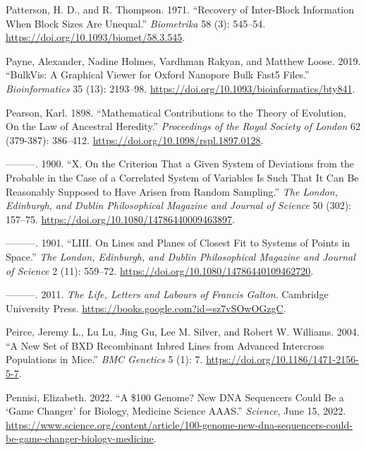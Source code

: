 \documentclass[
]{book}
\newlength{\cslhangindent}
\newlength{\cslentryspacingunit} %
\newenvironment{CSLReferences}[2] %
 {%
  \setlength{\parindent}{0pt}
  \ifodd #1
  \let\oldpar\par
  \def\par{\hangindent=\cslhangindent\oldpar}
  \fi
  \setlength{\parskip}{#2\cslentryspacingunit}
 }%
 {}
\begin{document}
\begin{CSLReferences}{1}{0}
\leavevmode{}%
Patterson, H. D., and R. Thompson. 1971. {``Recovery of Inter-Block Information When Block Sizes Are Unequal.''} \emph{Biometrika} 58 (3): 545--54. \url{https://doi.org/10.1093/biomet/58.3.545}.

\leavevmode{}%
Payne, Alexander, Nadine Holmes, Vardhman Rakyan, and Matthew Loose. 2019. {``{BulkVis}: A Graphical Viewer for {Oxford} Nanopore Bulk {Fast5} Files.''} \emph{Bioinformatics} 35 (13): 2193--98. \url{https://doi.org/10.1093/bioinformatics/bty841}.

\leavevmode{}%
Pearson, Karl. 1898. {``Mathematical Contributions to the Theory of Evolution, {On} the Law of Ancestral Heredity.''} \emph{Proceedings of the Royal Society of London} 62 (379-387): 386--412. \url{https://doi.org/10.1098/rspl.1897.0128}.

\leavevmode{}%
---------. 1900. {``X. {On} the Criterion That a Given System of Deviations from the Probable in the Case of a Correlated System of Variables Is Such That It Can Be Reasonably Supposed to Have Arisen from Random Sampling.''} \emph{The London, Edinburgh, and Dublin Philosophical Magazine and Journal of Science} 50 (302): 157--75. \url{https://doi.org/10.1080/14786440009463897}.

\leavevmode{}%
---------. 1901. {``{LIII}. {On} Lines and Planes of Closest Fit to Systems of Points in Space.''} \emph{The London, Edinburgh, and Dublin Philosophical Magazine and Journal of Science} 2 (11): 559--72. \url{https://doi.org/10.1080/14786440109462720}.

\leavevmode{}%
---------. 2011. \emph{The {Life}, {Letters} and {Labours} of {Francis Galton}}. {Cambridge University Press}. \url{https://books.google.com?id=sz7vSOwOGzgC}.

\leavevmode{}%
Peirce, Jeremy L., Lu Lu, Jing Gu, Lee M. Silver, and Robert W. Williams. 2004. {``A New Set of {BXD} Recombinant Inbred Lines from Advanced Intercross Populations in Mice.''} \emph{BMC Genetics} 5 (1): 7. \url{https://doi.org/10.1186/1471-2156-5-7}.

\leavevmode{}%
Pennisi, Elizabeth. 2022. {``A \$100 Genome? {New DNA} Sequencers Could Be a {`Game Changer'} for Biology, Medicine \textbar{} {Science} \textbar{} {AAAS}.''} \emph{Science}, June 15, 2022. \url{https://www.science.org/content/article/100-genome-new-dna-sequencers-could-be-game-changer-biology-medicine}.


\end{CSLReferences}
\end{document}
